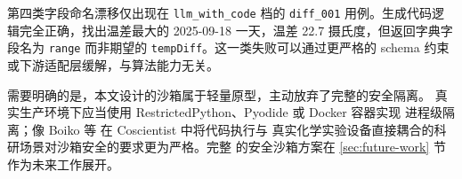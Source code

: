第四类字段命名漂移仅出现在 \texttt{llm\_\bk{}with\_\bk{}code} 档的
\texttt{diff\_\bk{}001} 用例。生成代码逻辑完全正确，找出温差最大的
2025-09-18 一天，温差 22.7 摄氏度，但返回字典字段名为 \texttt{range}
而非期望的 \texttt{tempDiff}。这一类失败可以通过更严格的 schema 约束
或下游适配层缓解，与算法能力无关。

需要明确的是，本文设计的沙箱属于轻量原型，主动放弃了完整的安全隔离。
真实生产环境下应当使用 RestrictedPython、Pyodide 或 Docker 容器实现
进程级隔离；像 Boiko 等 \cite{ref23} 在 Coscientist 中将代码执行与
真实化学实验设备直接耦合的科研场景对沙箱安全的要求更为严格。完整
的安全沙箱方案在 \ref{sec:future-work} 节作为未来工作展开。
